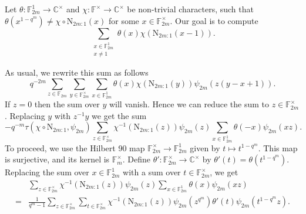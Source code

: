 \documentclass[12pt, reqno]{amsart}
\theoremstyle{definition}
\theoremstyle{definition}
\theoremstyle{definition}
\newcommand{\cComplex}{\mathbb{C}}
\newcommand{\multiplicativegroup}[1]{#1^{\times}}
\newcommand{\fieldCharacter}{\psi}
\newcommand{\FieldNorm}[2]{\mathrm{N}_{#1:#2}}
\newcommand{\finiteField}{\mathbb{F}}
\newcommand{\finiteFieldExtension}[1]{\finiteField_{#1}}
\begin{document}
Let $\theta \colon \finiteFieldExtension{2m}^1 \to \multiplicativegroup{\cComplex}$ and $\chi \colon \multiplicativegroup{\finiteField} \to \multiplicativegroup{\cComplex}$ be non-trivial characters, such that $\theta\left(x^{1-q^m}\right) \ne \chi \circ \FieldNorm{2m}{1}\left(x\right)$ for some $x \in \multiplicativegroup{\finiteFieldExtension{2m}}$. Our goal is to compute $$\sum_{\substack{x \in \finiteFieldExtension{2m}^1\\
		x \ne 1}} \theta \left(x\right) \chi\left(\FieldNorm{2m}{1}\left(x - 1\right)\right).$$

As usual, we rewrite this sum as follows
$$q^{-2m} \sum_{z \in \finiteFieldExtension{2m}} \sum_{y \in \multiplicativegroup{\finiteFieldExtension{2m}}} \sum_{x \in \finiteFieldExtension{2m}^1} \theta \left(x\right) \chi\left(\FieldNorm{2m}{1}\left(y\right)\right) \fieldCharacter_{2m}\left(z\left(y-x+1\right)\right).$$
If $z=0$ then the sum over $y$ will vanish. Hence we can reduce the sum to $z \in \multiplicativegroup{\finiteFieldExtension{2m}}$. Replacing $y$ with $z^{-1} y$ we get the sum
$$-q^{-m} \tau\left(\chi \circ \FieldNorm{2m}{1}, \fieldCharacter_{2m}\right) \sum_{z \in \multiplicativegroup{\finiteFieldExtension{2m}}} \chi^{-1}\left(\FieldNorm{2m}{1}\left(z\right)\right) \fieldCharacter_{2m}\left(z\right)  \sum_{x \in \finiteFieldExtension{2m}^1} \theta \left(-x\right) \fieldCharacter_{2m}\left(xz\right).$$
To proceed, we use the Hilbert 90 map $\multiplicativegroup{\finiteFieldExtension{2m}} \to \finiteFieldExtension{2m}^1$ given by $t \mapsto t^{1 - q^m}$. This map is surjective, and its kernel is $\multiplicativegroup{\finiteFieldExtension{m}}$. Define $\theta' \colon \multiplicativegroup{\finiteFieldExtension{2m}} \to \multiplicativegroup{\cComplex}$ by $\theta'\left(t\right) = \theta\left(t^{1-q^m}\right)$. Replacing the sum over $x \in \finiteFieldExtension{2m}^1$ with a sum over $t \in \multiplicativegroup{\finiteFieldExtension{2m}}$, we get \begin{align*}
	& \sum_{z \in \multiplicativegroup{\finiteFieldExtension{2m}}} \chi^{-1}\left(\FieldNorm{2m}{1}\left(z\right)\right) \fieldCharacter_{2m}\left(z\right) \sum_{x \in \finiteFieldExtension{2m}^1} \theta \left(x\right) \fieldCharacter_{2m}\left(xz\right) \\
	= & \frac{1}{q^m-1}\sum_{z \in \multiplicativegroup{\finiteFieldExtension{2m}}} \sum_{t \in \multiplicativegroup{\finiteFieldExtension{2m}}} \chi^{-1}\left(\FieldNorm{2m}{1}\left(z\right)\right) \fieldCharacter_{2m}\left(z^{q^m}\right) \theta' \left(t\right) \fieldCharacter_{2m}\left(t^{1-q^m} z\right).
\end{align*}
\end{document}
